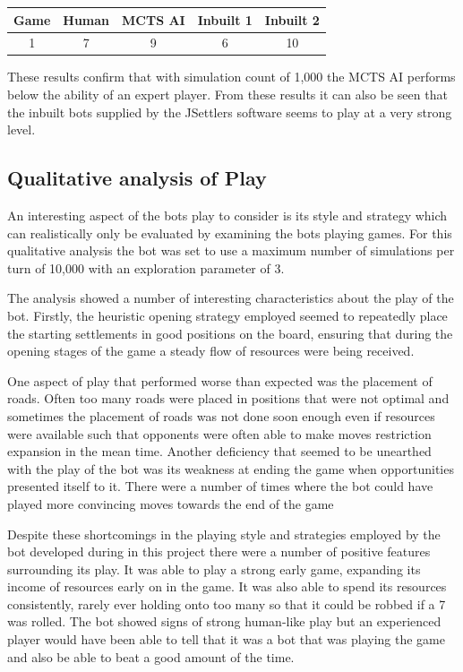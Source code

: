 \documentclass[]{article}
\begin{document}
\begin{center}
\begin{tabular}{|c||c|c|c|c|}
\hline
Game & Human & MCTS AI & Inbuilt 1 & Inbuilt 2\\
\hline
1 & 7 & 9 & 6 & 10\\
\hline
\end{tabular}
\end{center}

These results confirm that with simulation count of 1,000 the MCTS AI performs below the ability of an expert player. From these results it can also be seen that the inbuilt bots supplied by the JSettlers software seems to play at a very strong level. 


\subsection{Qualitative analysis of Play}
An interesting aspect of the bots play to consider is its style and strategy which can realistically only be evaluated by examining the bots playing games. For this qualitative analysis the bot was set to use a maximum number of simulations per turn of 10,000 with an exploration parameter of 3.

\par The analysis showed a number of interesting characteristics about the play of the bot. Firstly, the heuristic opening strategy employed seemed to repeatedly place the starting settlements in good positions on the board, ensuring that during the opening stages of the game a steady flow of resources were being received.

\par One aspect of play that performed worse than expected was the placement of roads. Often too many roads were placed in positions that were not optimal and sometimes the placement of roads was not done soon enough even if resources were available such that opponents were often able to make moves restriction expansion in the mean time. Another deficiency that seemed to be unearthed with the play of the bot was its weakness at ending the game when opportunities presented itself to it. There were a number of times where the bot could have played more convincing moves towards the end of the game

\par Despite these shortcomings in the playing style and strategies employed by the bot developed during in this project there were a number of positive features surrounding its play. It was able to play a strong early game, expanding its income of resources early on in the game. It was also able to spend its resources consistently, rarely ever holding onto too many so that it could be robbed if a 7 was rolled. The bot showed signs of strong human-like play but an experienced player would have been able to tell that it was a bot that was playing the game and also be able to beat a good amount of the time.
\end{document}
